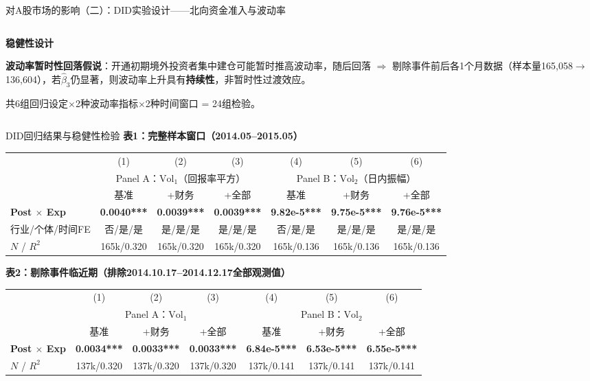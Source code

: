 \documentclass[10pt, aspectratio=169]{beamer}
\begin{document}
\begin{frame}{对A股市场的影响（二）：DID实验设计——北向资金准入与波动率}
\begin{columns}[T]
\begin{column}{0.43\textwidth}
\vspace{0.3em}
\textbf{稳健性设计}

\textbf{波动率暂时性回落假说}：开通初期境外投资者集中建仓可能暂时推高波动率，随后回落 $\Rightarrow$ 剔除事件前后各1个月数据（样本量165,058$\to$136,604），若$\hat{\beta}_3$仍显著，则波动率上升具有\textbf{持续性}，非暂时性过渡效应。

\vspace{0.2em}
{\scriptsize 共6组回归设定$\times$2种波动率指标$\times$2种时间窗口 = 24组检验。}
\end{column}
\end{columns}
\end{frame}

\begin{frame}{DID回归结果与稳健性检验}
\centering
\vspace{-0.3em}
{\tiny \textbf{表1：完整样本窗口（2014.05--2015.05）}}

\vspace{-0.2em}
{\tiny
\begin{tabular}{lcccccc}
\toprule
& (1) & (2) & (3) & (4) & (5) & (6) \\
& \multicolumn{3}{c}{Panel A：$\text{Vol}_1$（回报率平方）} & \multicolumn{3}{c}{Panel B：$\text{Vol}_2$（日内振幅）} \\
\cmidrule(lr){2-4} \cmidrule(lr){5-7}
& 基准 & +财务 & +全部 & 基准 & +财务 & +全部 \\
\midrule
\textbf{Post $\times$ Exp} & \textbf{0.0040***} & \textbf{0.0039***} & \textbf{0.0039***} & \textbf{9.82e-5***} & \textbf{9.75e-5***} & \textbf{9.76e-5***} \\
行业/个体/时间FE & 否/是/是 & 是/是/是 & 是/是/是 & 否/是/是 & 是/是/是 & 是/是/是 \\
$N$ / $R^2$ & 165k/0.320 & 165k/0.320 & 165k/0.320 & 165k/0.136 & 165k/0.136 & 165k/0.136 \\
\bottomrule
\end{tabular}
}

\vspace{0.3em}
{\tiny \textbf{表2：剔除事件临近期（排除2014.10.17--2014.12.17全部观测值）}}

\vspace{-0.2em}
{\tiny
\begin{tabular}{lcccccc}
\toprule
& (1) & (2) & (3) & (4) & (5) & (6) \\
& \multicolumn{3}{c}{Panel A：$\text{Vol}_1$} & \multicolumn{3}{c}{Panel B：$\text{Vol}_2$} \\
\cmidrule(lr){2-4} \cmidrule(lr){5-7}
& 基准 & +财务 & +全部 & 基准 & +财务 & +全部 \\
\midrule
\textbf{Post $\times$ Exp} & \textbf{0.0034***} & \textbf{0.0033***} & \textbf{0.0033***} & \textbf{6.84e-5***} & \textbf{6.53e-5***} & \textbf{6.55e-5***} \\
$N$ / $R^2$ & 137k/0.320 & 137k/0.320 & 137k/0.320 & 137k/0.141 & 137k/0.141 & 137k/0.141 \\
\bottomrule
\end{tabular}
}


\end{frame}
\end{document}
